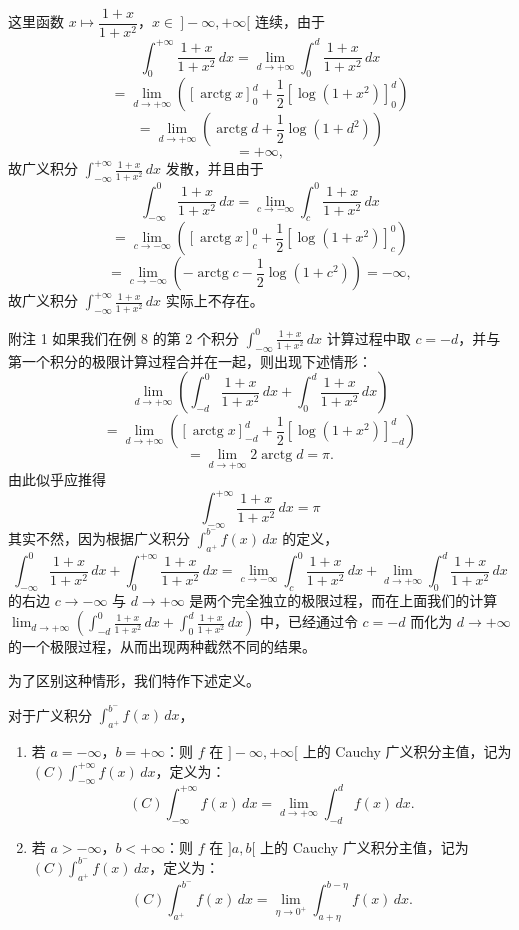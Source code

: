 这里函数 $x\longmapsto\dfrac{1+x}{1+x^2}$，$x\in\ ]-\infty,+\infty[$ 连续，由于
\[\int_0^{+\infty}\frac{1+x}{1+x^2}\,dx=\lim_{d\to+\infty}\int_0^d\frac{1+x}{1+x^2}\,dx\]
\[=\lim_{d\to+\infty}\left(\left[\operatorname{arctg}x\right]_0^d+\frac{1}{2}\left[\log(1+x^2)\right]_0^d\right)\]
\[=\lim_{d\to+\infty}\left(\operatorname{arctg}d+\frac{1}{2}\log(1+d^2)\right)\]
\[=+\infty,\]
故广义积分 $\displaystyle\int_{-\infty}^{+\infty}\frac{1+x}{1+x^2}\,dx$ 发散，并且由于
\[\int_{-\infty}^{0}\frac{1+x}{1+x^2}\,dx=\lim_{c\to-\infty}\int_c^0\frac{1+x}{1+x^2}\,dx\]
\[=\lim_{c\to-\infty}\left(\left[\operatorname{arctg}x\right]_c^0+\frac{1}{2}\left[\log(1+x^2)\right]_c^0\right)\]
\[=\lim_{c\to-\infty}\left(-\operatorname{arctg}c-\frac{1}{2}\log(1+c^2)\right)=-\infty,\]
故广义积分 $\displaystyle\int_{-\infty}^{+\infty}\frac{1+x}{1+x^2}\,dx$ 实际上不存在。

附注 1 如果我们在例 8 的第 2 个积分 $\displaystyle\int_{-\infty}^{0}\frac{1+x}{1+x^2}\,dx$ 计算过程中取 $c=-d$，并与第一个积分的极限计算过程合并在一起，则出现下述情形：
\[\lim_{d\to+\infty}\left(\int_{-d}^{0}\frac{1+x}{1+x^2}\,dx+\int_{0}^{d}\frac{1+x}{1+x^2}\,dx\right)\]
\[=\lim_{d\to+\infty}\left(\left[\operatorname{arctg}x\right]_{-d}^{d}+\frac{1}{2}\left[\log(1+x^2)\right]_{-d}^{d}\right)\]
\[=\lim_{d\to+\infty}2\operatorname{arctg}d=\pi.\]
由此似乎应推得
\[\int_{-\infty}^{+\infty}\frac{1+x}{1+x^2}\,dx=\pi\]
其实不然，因为根据广义积分 $\displaystyle\int_{a^+}^{b^-}f(x)\,dx$ 的定义，
\[\int_{-\infty}^{0}\frac{1+x}{1+x^2}\,dx+\int_{0}^{+\infty}\frac{1+x}{1+x^2}\,dx=\lim_{c\to-\infty}\int_{c}^{0}\frac{1+x}{1+x^2}\,dx+\lim_{d\to+\infty}\int_{0}^{d}\frac{1+x}{1+x^2}\,dx\]
的右边 $c\to-\infty$ 与 $d\to+\infty$ 是两个完全独立的极限过程，而在上面我们的计算 $\displaystyle\lim_{d\to+\infty}\left(\int_{-d}^{0}\frac{1+x}{1+x^2}\,dx+\int_{0}^{d}\frac{1+x}{1+x^2}\,dx\right)$ 中，已经通过令 $c=-d$ 而化为 $d\to+\infty$ 的一个极限过程，从而出现两种截然不同的结果。

为了区别这种情形，我们特作下述定义。

\begin{mydef*}{}

对于广义积分 $\displaystyle\int_{a^+}^{b^-}f(x)\,dx$，

\begin{enumerate}[label=\arabic{enumi})]
\item 若 $a=-\infty$，$b=+\infty$：则 $f$ 在 $]-\infty,+\infty[$ 上的 Cauchy 广义积分主值，记为 $(C)\displaystyle\int_{-\infty}^{+\infty}f(x)\,dx$，定义为：
\[(C)\int_{-\infty}^{+\infty}f(x)\,dx=\lim_{d\to+\infty}\int_{-d}^{d}f(x)\,dx.\]
\item 若 $a>-\infty$，$b<+\infty$：则 $f$ 在 $]a,b[$ 上的 Cauchy 广义积分主值，记为 $(C)\displaystyle\int_{a^+}^{b^-}f(x)\,dx$，定义为：
\[(C)\int_{a^+}^{b^-}f(x)\,dx=\lim_{\eta\to0^+}\int_{a+\eta}^{b-\eta}f(x)\,dx.\]
\end{enumerate}

\end{mydef*}

